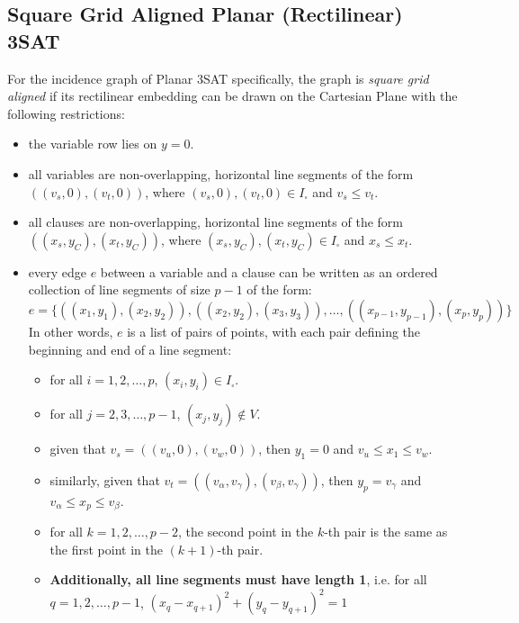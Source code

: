 \subsection{Square Grid Aligned Planar (Rectilinear) 3SAT}

For the incidence graph of Planar 3SAT specifically, the graph is \textit{square grid aligned} if its rectilinear embedding
can be drawn on the Cartesian Plane with the following restrictions:

\begin{itemize}
    \item the variable row lies on $y=0$.
    \item all variables are non-overlapping, horizontal line segments of the form $((v_s, 0), (v_t, 0))$,
    where $(v_s, 0), (v_t, 0)\in I_{\square}$ and $v_s \leq v_t$.
    \item all clauses are non-overlapping, horizontal line segments of the form $((x_s, y_C), (x_t, y_C))$,
    where $(x_s, y_C), (x_t, y_C)\in I_{\square}$ and $x_s \leq x_t$.
    \item every edge $e$ between a variable and a clause can be written as an ordered collection of line segments of size $p-1$ of the form:
    $$e = \{ \left( (x_1, y_1), (x_2, y_2) \right), \left( (x_2, y_2), (x_3, y_3) \right), \dots, \left( (x_{p-1}, y_{p-1}), (x_p, y_p) \right) \}$$
    In other words, $e$ is a list of pairs of points, with each pair defining the beginning and end of a line segment:
    \begin{itemize}[label=$\circ$]
        \item for all $i=1,2,\dots, p$, $(x_i, y_i) \in I_{\square}$.
        \item for all $j=2,3,\dots, p-1$, $(x_j, y_j) \notin V$.
        \item given that $v_s = ((v_{u}, 0), (v_{w}, 0))$, then $y_1=0$ and $v_u \leq x_1 \leq v_w$.
        \item similarly, given that $v_t = ((v_{\alpha}, v_\gamma), (v_{\beta}, v_\gamma))$,
        then $y_p=v_\gamma$ and $v_\alpha \leq x_p \leq v_\beta$.
        \item for all $k=1, 2, \dots, p-2$, the second point in the $k$-th pair is the same as the first point in the $(k+1)$-th pair.
        \item \textbf{Additionally, all line segments must have length 1}, i.e. \newline for all $q=1,2,\dots, p-1$, $(x_q - x_{q+1})^2 + (y_q - y_{q+1})^2 = 1$
    \end{itemize}
    
\end{itemize}

